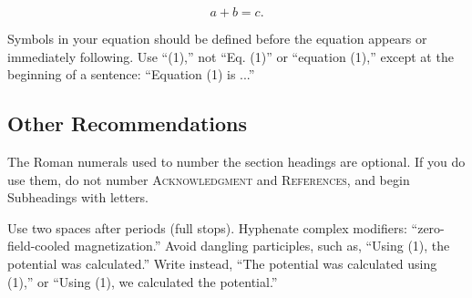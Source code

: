\documentclass[dvipdfmx,conference,a4paper,nofonttune]{APSIPA}
\begin{document}
\begin{equation}
 a + b = c.
\end{equation}

Symbols in your equation should be defined before the equation appears
or immediately following.  Use ``(1),'' not ``Eq. (1)'' or ``equation
(1),'' except at the beginning of a sentence: ``Equation (1) is ...''

\subsection{Other Recommendations}

The Roman numerals used to number the section headings are optional.
If you do use them, do not number {\scshape{Acknowledgment}} and
{\scshape{References}}, and begin Subheadings with letters.

Use two spaces after periods (full stops).  Hyphenate complex
modifiers: ``zero-field-cooled magnetization.''  Avoid dangling
participles, such as, ``Using (1), the potential was calculated.''
Write instead, ``The potential was calculated using (1),'' or ``Using
(1), we calculated the potential.''


\end{document}
